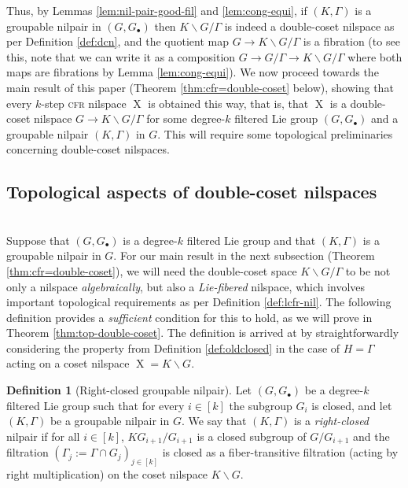\documentclass[a4paper,12pt,reqno]{amsart}
\theoremstyle{definition}
\newtheorem{defn}[theorem]{Definition}
\def\to{\rightarrow}
\DeclareMathOperator{\ns}{X}
\begin{document}
\noindent Thus, by Lemmas \ref{lem:nil-pair-good-fil} and \ref{lem:cong-equi}, if $(K,\Gamma)$ is a groupable nilpair in $(G,G_\bullet)$ then $K\backslash G/{\Gamma}$ is indeed a double-coset nilspace as per Definition \ref{def:dcn}, and the quotient map $G\to K\backslash G/\Gamma$ is a fibration (to see this, note that we can write it as a composition $G\to G/{\Gamma}\to K\backslash G/{\Gamma}$ where both maps are fibrations by Lemma \ref{lem:cong-equi}). We now proceed towards the  main result of this paper (Theorem \ref{thm:cfr=double-coset} below), showing that every $k$-step \textsc{cfr} nilspace $\ns$ is obtained this way, that is, that $\ns$ is a double-coset nilspace $G\to K\backslash G/{\Gamma}$ for some degree-$k$ filtered Lie group $(G,G_\bullet)$ and a groupable nilpair $(K,\Gamma)$ in $G$. This will require some topological preliminaries concerning double-coset nilspaces.


\subsection{Topological aspects of double-coset nilspaces}\hfill\smallskip\\
Suppose that $(G,G_\bullet)$ is a degree-$k$ filtered Lie group and that $(K,\Gamma)$ is a groupable nilpair in $G$. For our main result in the next subsection (Theorem \ref{thm:cfr=double-coset}), we will need the double-coset space $K\backslash G/{\Gamma}$ to be not only a nilspace \emph{algebraically}, but also a \emph{Lie-fibered} nilspace, which involves important topological requirements as per Definition \ref{def:lcfr-nil}. The following definition provides a \emph{sufficient} condition for this to hold, as we will prove in Theorem \ref{thm:top-double-coset}. The definition is arrived at by straightforwardly considering the property from Definition \ref{def:oldclosed} in the case of $H=\Gamma$ acting on a coset nilspace $\ns=K\backslash G$.

\begin{defn}[Right-closed groupable nilpair]\label{def:rcc}
Let $(G,G_\bullet)$ be a degree-$k$ filtered Lie group such that for every $i\in [k]$ the subgroup $G_i$ is closed, and let $(K,\Gamma)$ be a groupable nilpair in $G$. We say that  $(K,\Gamma)$ is a \emph{right-closed}  nilpair if for all $i\in[k]$, $KG_{i+1}/G_{i+1}$ is a closed subgroup of $G/G_{i+1}$ and the filtration $(\Gamma_j:=\Gamma\cap G_j)_{j\in[k]}$ is closed as a fiber-transitive filtration (acting by right multiplication) on the coset nilspace $K \backslash G$. 
\end{defn}
\end{document}
